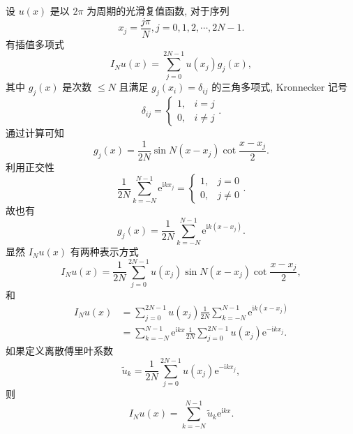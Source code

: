 设 $u(x)$ 是以 $2 \pi$ 为周期的光滑复值函数, 对于序列
\begin{equation}
x_j=\frac{j \pi}{N}, j=0,1,2, \cdots, 2 N-1.
\end{equation}
有插值多项式
\begin{equation}
I_N u(x)=\sum_{j=0}^{2 N-1} u\left(x_j\right) g_j(x),\label{eq:FT1}
\end{equation}
其中 $g_j(x)$ 是次数 $\leq N$ 且满足 $g_j\left(x_i\right)=\delta_{i j}$ 的三角多项式, 
Kronnecker 记号
\begin{equation}
\delta_{i j}= \begin{cases}1, & i=j \\ 0, & i \neq j\end{cases}
.\end{equation}
通过计算可知
\begin{equation}
g_j(x)=\frac{1}{2 N} \sin N\left(x-x_j\right) \cot \frac{x-x_j}{2}.
\end{equation}
利用正交性
\begin{equation}
\frac{1}{2 N} \sum_{k=-N}^{N-1} \mathrm{e}^{\mathrm{i} k x_j}= \begin{cases}1, & j=0 \\ 0, & j \neq 0\end{cases}.
\end{equation}
故也有
\begin{equation}
g_j(x)=\frac{1}{2 N} \sum_{k=-N}^{N-1} \mathrm{e}^{\mathrm{i} k\left(x-x_j\right)}.
\end{equation}
显然 $I_N u(x)$ 有两种表示方式
\begin{equation}
I_N u(x)=\frac{1}{2 N} \sum_{j=0}^{2 N-1} u\left(x_j\right) \sin N\left(x-x_j\right) \cot \frac{x-x_j}{2},
\end{equation}
和
\begin{equation}
\begin{aligned}
I_N u(x)&=\sum_{j=0}^{2 N-1} u\left(x_j\right) \frac{1}{2 N} \sum_{k=-N}^{N-1} \mathrm{e}^{\mathrm{i} k\left(x-x_j\right)} \\
&=\sum_{k=-N}^{N-1} \mathrm{e}^{\mathrm{i} k x} \frac{1}{2 N} \sum_{j=0}^{2 N-1} u\left(x_j\right) \mathrm{e}^{-\mathrm{i} k x_j}.
\end{aligned}
\end{equation}
如果定义离散傅里叶系数
\begin{equation}
\tilde{u}_k=\frac{1}{2 N} \sum_{j=0}^{2 N-1} u\left(x_j\right) \mathrm{e}^{-\mathrm{i} k x_j},
\end{equation}
则
\begin{equation}
I_N u(x)=\sum_{k=-N}^{N-1} \tilde{u}_k \mathrm{e}^{\mathrm{i} k x}.
\end{equation}

